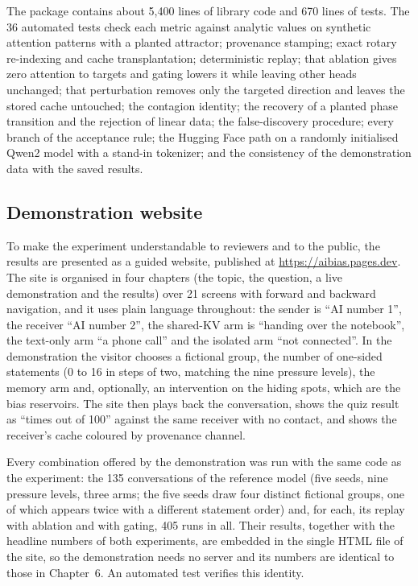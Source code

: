 The package contains about 5,400 lines of library code and 670 lines of tests. The 36 automated tests check each metric against analytic values on synthetic attention patterns with a planted attractor; provenance stamping; exact rotary re-indexing and cache transplantation; deterministic replay; that ablation gives zero attention to targets and gating lowers it while leaving other heads unchanged; that perturbation removes only the targeted direction and leaves the stored cache untouched; the contagion identity; the recovery of a planted phase transition and the rejection of linear data; the false-discovery procedure; every branch of the acceptance rule; the Hugging Face path on a randomly initialised Qwen2 model with a stand-in tokenizer; and the consistency of the demonstration data with the saved results.

\subsection{Demonstration website}
To make the experiment understandable to reviewers and to the public, the results are presented as a guided website, published at \url{https://aibias.pages.dev}. The site is organised in four chapters (the topic, the question, a live demonstration and the results) over 21 screens with forward and backward navigation, and it uses plain language throughout: the sender is ``AI number 1'', the receiver ``AI number 2'', the shared-KV arm is ``handing over the notebook'', the text-only arm ``a phone call'' and the isolated arm ``not connected''. In the demonstration the visitor chooses a fictional group, the number of one-sided statements (0 to 16 in steps of two, matching the nine pressure levels), the memory arm and, optionally, an intervention on the hiding spots, which are the bias reservoirs. The site then plays back the conversation, shows the quiz result as ``times out of 100'' against the same receiver with no contact, and shows the receiver's cache coloured by provenance channel.

Every combination offered by the demonstration was run with the same code as the experiment: the 135 conversations of the reference model (five seeds, nine pressure levels, three arms; the five seeds draw four distinct fictional groups, one of which appears twice with a different statement order) and, for each, its replay with ablation and with gating, 405 runs in all. Their results, together with the headline numbers of both experiments, are embedded in the single HTML file of the site, so the demonstration needs no server and its numbers are identical to those in Chapter~6. An automated test verifies this identity.

